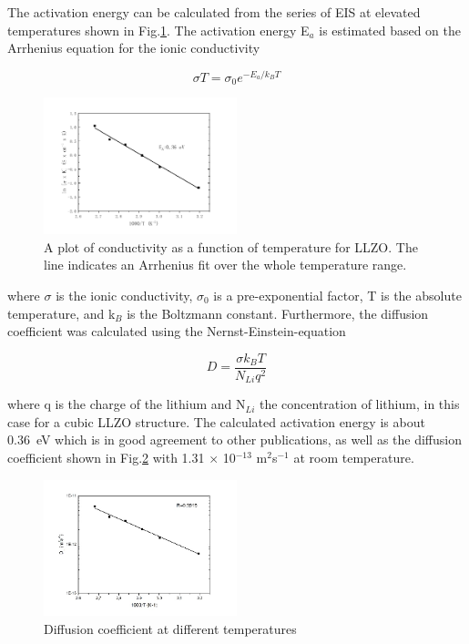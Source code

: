 \documentclass[twoside,twocolumn,9pt]{article}
\begin{document}
The activation energy can be calculated from the series of EIS at elevated temperatures shown in Fig.\ref{fig:arrhenius-plot}.
The activation energy E$_a$ is estimated based on the Arrhenius equation for the ionic conductivity

\begin{equation}
\sigma T = \sigma_0 e^{-E_a/k_B T}
\end{equation}


\begin{figure}
\centering
\includegraphics[width=0.5\textwidth]{Pics/arrhenius-plot.png}
\caption{A plot of conductivity as a function of temperature for LLZO. The line indicates an Arrhenius fit over the whole temperature range.}
\label{fig:arrhenius-plot}
\end{figure}

where $\sigma$ is the ionic conductivity, $\sigma_0$ is a pre-exponential factor, T is the absolute temperature, and k$_B$ is the Boltzmann constant. 
Furthermore, the diffusion coefficient was calculated using the Nernst-Einstein-equation

\begin{equation}
D=\frac{\sigma k_B T}{N_{Li} q^2}
\end{equation}

where q is the charge of the lithium and N$_{Li}$ the concentration of lithium, in this case for a cubic LLZO structure.
The calculated activation energy is about 0.36~eV which is in good agreement to other publications, 
as well as the diffusion coefficient shown in Fig.\ref{fig:DiffusionCoefficient} with 1.31 $\times$ 10$^{-13}$ m$^2$s$^{-1}$ at room temperature.  



\begin{figure}
\centering
\includegraphics[width=0.5\textwidth]{Pics/DiffusionCoefficient.png}
\caption{Diffusion coefficient at different temperatures}
\label{fig:DiffusionCoefficient}
\end{figure}
\end{document}
